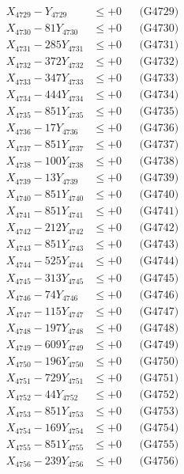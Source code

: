 \documentclass[a4paper,10pt]{article}
\begin{document}
{\begin{align}
X_{4729} - Y_{4729} &\leq +0 && \text{(G4729)} \\
X_{4730} - 81Y_{4730} &\leq +0 && \text{(G4730)} \\
\allowbreak
X_{4731} - 285Y_{4731} &\leq +0 && \text{(G4731)} \\
X_{4732} - 372Y_{4732} &\leq +0 && \text{(G4732)} \\
X_{4733} - 347Y_{4733} &\leq +0 && \text{(G4733)} \\
X_{4734} - 444Y_{4734} &\leq +0 && \text{(G4734)} \\
X_{4735} - 851Y_{4735} &\leq +0 && \text{(G4735)} \\
X_{4736} - 17Y_{4736} &\leq +0 && \text{(G4736)} \\
X_{4737} - 851Y_{4737} &\leq +0 && \text{(G4737)} \\
X_{4738} - 100Y_{4738} &\leq +0 && \text{(G4738)} \\
X_{4739} - 13Y_{4739} &\leq +0 && \text{(G4739)} \\
X_{4740} - 851Y_{4740} &\leq +0 && \text{(G4740)} \\
\allowbreak
X_{4741} - 851Y_{4741} &\leq +0 && \text{(G4741)} \\
X_{4742} - 212Y_{4742} &\leq +0 && \text{(G4742)} \\
X_{4743} - 851Y_{4743} &\leq +0 && \text{(G4743)} \\
X_{4744} - 525Y_{4744} &\leq +0 && \text{(G4744)} \\
X_{4745} - 313Y_{4745} &\leq +0 && \text{(G4745)} \\
X_{4746} - 74Y_{4746} &\leq +0 && \text{(G4746)} \\
X_{4747} - 115Y_{4747} &\leq +0 && \text{(G4747)} \\
X_{4748} - 197Y_{4748} &\leq +0 && \text{(G4748)} \\
X_{4749} - 609Y_{4749} &\leq +0 && \text{(G4749)} \\
X_{4750} - 196Y_{4750} &\leq +0 && \text{(G4750)} \\
\allowbreak
X_{4751} - 729Y_{4751} &\leq +0 && \text{(G4751)} \\
X_{4752} - 44Y_{4752} &\leq +0 && \text{(G4752)} \\
X_{4753} - 851Y_{4753} &\leq +0 && \text{(G4753)} \\
X_{4754} - 169Y_{4754} &\leq +0 && \text{(G4754)} \\
X_{4755} - 851Y_{4755} &\leq +0 && \text{(G4755)} \\
X_{4756} - 239Y_{4756} &\leq +0 && \text{(G4756)} \\

\end{align}}
\end{document}

